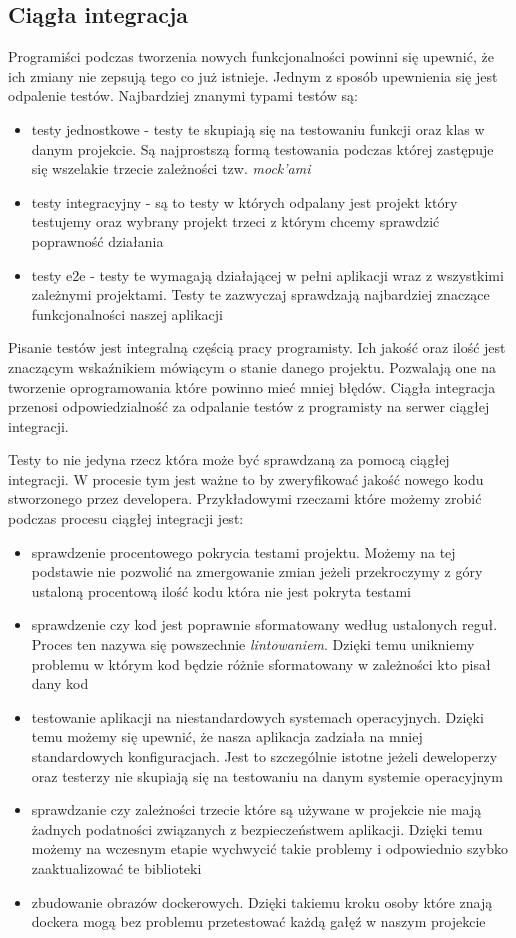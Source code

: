 \subsection{Ciągła integracja}
Programiści podczas tworzenia nowych funkcjonalności powinni się upewnić, że ich zmiany nie zepsują tego co już istnieje. Jednym z sposób upewnienia się jest odpalenie testów. Najbardziej znanymi typami testów są:
\begin{itemize}
    \item testy jednostkowe - testy te skupiają się na testowaniu funkcji oraz klas w danym projekcie. Są najprostszą formą testowania podczas której zastępuje się wszelakie trzecie zależności tzw. \textit{mock'ami}
    \item testy integracyjny - są to testy w których odpalany jest projekt który testujemy oraz wybrany projekt trzeci z którym chcemy sprawdzić poprawność działania
    \item testy e2e - testy te wymagają działającej w pełni aplikacji wraz z wszystkimi zależnymi projektami. Testy te zazwyczaj sprawdzają najbardziej znaczące funkcjonalności naszej aplikacji
\end{itemize}
Pisanie testów jest integralną częścią pracy programisty. Ich jakość oraz ilość jest znaczącym wskaźnikiem mówiącym o stanie danego projektu. Pozwalają one na tworzenie oprogramowania które powinno mieć mniej błędów. Ciągła integracja przenosi odpowiedzialność za odpalanie testów z programisty na serwer ciągłej integracji.
\par
Testy to nie jedyna rzecz która może być sprawdzaną za pomocą ciągłej integracji. W procesie tym jest ważne to by zweryfikować jakość nowego kodu stworzonego przez developera. Przykładowymi rzeczami które możemy zrobić podczas procesu ciągłej integracji jest:
\begin{itemize}
    \item sprawdzenie procentowego pokrycia testami projektu. Możemy na tej podstawie nie pozwolić na zmergowanie zmian jeżeli przekroczymy z góry ustaloną procentową ilość kodu która nie jest pokryta testami
    \item sprawdzenie czy kod jest poprawnie sformatowany według ustalonych reguł. Proces ten nazywa się powszechnie \textit{lintowaniem}. Dzięki temu unikniemy problemu w którym kod będzie różnie sformatowany w zależności kto pisał dany kod
    \item testowanie aplikacji na niestandardowych systemach operacyjnych. Dzięki temu możemy się upewnić, że nasza aplikacja zadziała na mniej standardowych konfiguracjach. Jest to szczególnie istotne jeżeli deweloperzy oraz testerzy nie skupiają się na testowaniu na danym systemie operacyjnym
    \item sprawdzanie czy zależności trzecie które są używane w projekcie nie mają żadnych podatności związanych z bezpieczeństwem aplikacji. Dzięki temu możemy na wczesnym etapie wychwycić takie problemy i odpowiednio szybko zaaktualizować te biblioteki
    \item zbudowanie obrazów dockerowych. Dzięki takiemu kroku osoby które znają dockera mogą bez problemu przetestować każdą gałęź w naszym projekcie
\end{itemize}
